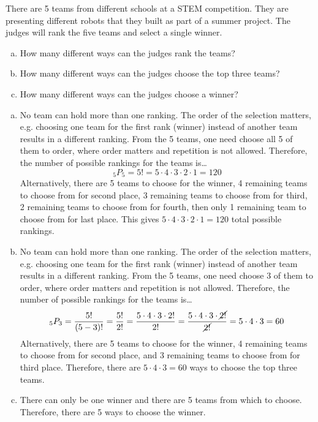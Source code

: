 \documentclass[11pt,letterpaper]{article}
\begin{document}
\newpage



 There are 5 teams from different schools at a STEM competition. They are presenting different robots that they built as part of a summer project. The judges will rank the five teams and select a single winner.
	\begin{enumerate}[(a)]
	\item How many different ways can the judges rank the teams?
	\item How many different ways can the judges choose the top three teams?
	\item How many different ways can the judges choose a winner?
	\end{enumerate} \pspace

\sol 
\begin{enumerate}[(a)]
\item No team can hold more than one ranking. The order of the selection matters, e.g. choosing one team for the first rank (winner) instead of another team results in a different ranking. From the 5 teams, one need choose all 5 of them to order, where order matters and repetition is not allowed. Therefore, the number of possible rankings for the teams is\dots
	\[
	_5P_5= 5!= 5 \cdot 4 \cdot 3 \cdot 2 \cdot 1= 120
	\] 
Alternatively, there are 5 teams to choose for the winner, 4 remaining teams to choose from for second place, 3 remaining teams to choose from for third, 2 remaining teams to choose from for fourth, then only 1 remaining team to choose from for last place. This gives $5 \cdot 4 \cdot 3 \cdot 2 \cdot 1= 120$ total possible rankings. \pspace

\item No team can hold more than one ranking. The order of the selection matters, e.g. choosing one team for the first rank (winner) instead of another team results in a different ranking. From the 5 teams, one need choose 3 of them to order, where order matters and repetition is not allowed. Therefore, the number of possible rankings for the teams is\dots
	\[
	_5P_3= \dfrac{5!}{(5 - 3)!}= \dfrac{5!}{2!}= \dfrac{5 \cdot 4 \cdot 3 \cdot 2!}{2!}= \dfrac{5 \cdot 4 \cdot 3 \cdot \cancel{2!}}{\cancel{2!}}= 5 \cdot 4 \cdot 3= 60
	\]
Alternatively, there are 5 teams to choose for the winner, 4 remaining teams to choose from for second place, and 3 remaining teams to choose from for third place. Therefore, there are $5 \cdot 4 \cdot 3= 60$ ways to choose the top three teams. \pspace

\item There can only be one winner and there are 5 teams from which to choose. Therefore, there are 5 ways to choose the winner. 
\end{enumerate}
\end{document}
